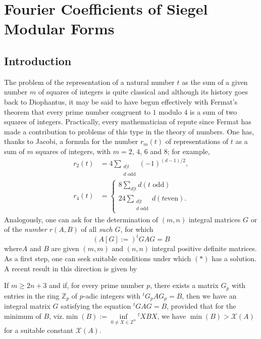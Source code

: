 
\chapter{Fourier Coefficients of Siegel Modular Forms}\label{c1}

\section*{Introduction}\label{c1-sec1}\pageoriginale

The problem of the representation of a natural number $t$ as the sum
of a given number $m$ of squares of integers is quite classical and
although its history goes back to Diophantus, it may be said to have
begun effectively with Fermat's theorem that every prime number
congruent to $1$ modulo $4$ is a sum of two squares of
integers. Practically, every mathematician of repute since Fermat has
made a contribution to problems of this type in the theory of
numbers. One has, thanks to Jacobi, a formula for the number
$r_{m}(t)$ of representations of $t$ as a sum of $m$ squares of
integers, with $m=2$, $4$, $6$ and $8$; for example,
\begin{align*}
r_{2}(t) &= 4\sum_{\substack{d|t\\ d\text{ odd}}} (-1)^{(d-1)/2},\\
r_{4}(t) &= 
\begin{cases}
 8\sum\limits_{d|t} d(t\text{ odd})\\
24 \sum\limits_{\substack{d|t\\ d\text{ odd}}} d(t \text{even}).
\end{cases}
\end{align*}
Analogously, one can ask for the determination of $(m,n)$ integral
matrices $G$ or of the {\em number} $r(A,B)$ of all {\em such} $G$,
for which
\begin{equation*}
(A[G]:=)^{t}GAG=B\tag{$\ast$}
\end{equation*}
where\pageoriginale $A$ and $B$ are given $(m,m)$ and $(n,n)$ integral positive
definite matrices. As a first step, one can seek suitable conditions
under which $(\ast)$ has a solution. A recent result in this direction
is given by

\begin{alphtheorem}\label{c1:alphthmA}
If $m\geq 2n+3$ and if, for every prime number $p$, there exists a
matrix $G_{p}$ with entries in the ring $\mathbb{Z}_{p}$ of $p$-adic
integers with ${}^{t}G_{p}AG_{p}=B$, then we have an integral matrix
$G$ satisfying the equation ${}^{t}GAG=B$, provided that for the
minimum of $B$, viz.\@ $\min(B):=\inf\limits_{0\neq X\in
  \mathbb{Z}^{n}}{}^{t}XBX$, we have $\min(B)>\mathscr{X}(A)$ for a
suitable constant $\mathscr{X}(A)$.
\end{alphtheorem}

